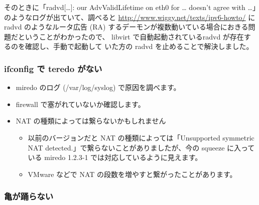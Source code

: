 \documentclass[mingoth,a4paper]{jsarticle}
\begin{document}
そのときに「radvd[\ldots{}]: our AdvValidLifetime on eth0 for \ldots{} doesn't
agree with \ldots{}」のようなログが出ていて、調べると
\url{http://www.wiggy.net/texts/ipv6-howto/} に radvd のようなルータ広告 (RA)
するデーモンが複数動いている場合におきる問題だということがわかったので、
libvirt で自動起動されているradvd が存在するのを確認し、手動で起動して
いた方の radvd を止めることで解決しました。
\subsubsection{ifconfig で teredo がない}

\begin{itemize}
\item miredo のログ (/var/log/syslog) で原因を調べます。
\item firewall で塞がれていないか確認します。
\item NAT の種類によっては繋らないかもしれません

\begin{itemize}
\item 以前のバージョンだと NAT の種類によっては「Unsupported symmetric
    NAT detected.」で繋らないことがありましたが、今の squeeze に入っている
    miredo 1.2.3-1 では対応しているように見えます。
\item VMware などで NAT の段数を増やすと繋がったことがあります。
\end{itemize}

\end{itemize}
\subsubsection{亀が踊らない}
\end{document}
